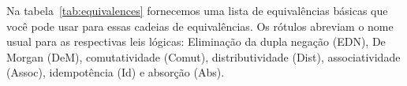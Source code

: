 Na tabela~\ref{tab:equivalences} fornecemos uma lista de equivalências básicas que você pode usar para essas cadeias de equivalências. Os rótulos abreviam o nome usual para as respectivas leis lógicas: Eliminação da dupla negação (EDN), De Morgan (DeM), comutatividade (Comut), distributividade (Dist), associatividade (Assoc), idempotência (Id) e absorção (Abs).


\begin{table}
\end{table}
